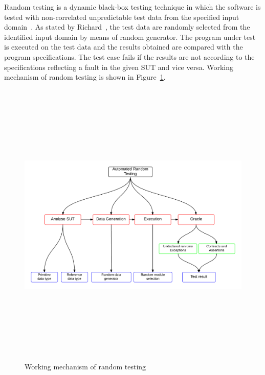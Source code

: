 Random testing is a dynamic black-box testing technique in which the software is tested with non-correlated unpredictable test data from the specified input domain~\cite{chan2003normalized}. As stated by Richard~\cite{hamlet1994random}, the test data are randomly selected from the identified input domain by means of random generator. The program under test is executed on the test data and the results obtained are compared with the program specifications. The test case fails if the results are not according to the specifications reflecting a fault in the given SUT and vice versa. Working mechanism of random testing is shown in Figure~\ref{fig:workingmechanism}.

\bigskip
\bigskip

\begin{figure}[h]
	\centering
	\centerline{\includegraphics[width=16.5cm, height=14cm ]{chapter2/randomTestingMechanism.png}}
	\bigskip
	\caption{Working mechanism of random testing}
	\label{fig:workingmechanism}
\end{figure}
\bigskip

